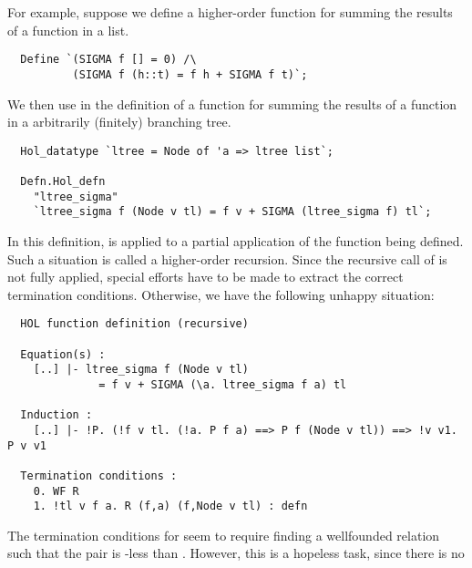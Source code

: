For example, suppose we define a higher-order function  for
summing the results of a function in a list. 
%
\setcounter{sessioncount}{0}
\begin{session}
\begin{hol}
\begin{verbatim}
  Define `(SIGMA f [] = 0) /\
          (SIGMA f (h::t) = f h + SIGMA f t)`;
\end{verbatim}
\end{hol}
\end{session}
% 
We then use  in the definition of a function for 
summing the results of a function in a arbitrarily 
(finitely) branching tree.
%
\begin{session}
\begin{hol}
\begin{verbatim}
  Hol_datatype `ltree = Node of 'a => ltree list`;
 
  Defn.Hol_defn  
    "ltree_sigma"
    `ltree_sigma f (Node v tl) = f v + SIGMA (ltree_sigma f) tl`;
\end{verbatim}
\end{hol}
\end{session}
%
In this definition, \holtxt{SIGMA} is applied to a partial application 
\holtxt{(ltree\_sigma f)} of the function being defined. Such a situation
is called a higher-order recursion. Since the recursive call of 
\holtxt{ltree\_sigma} is not fully applied, special efforts have
to be made to extract the correct termination conditions. Otherwise,
we have the following unhappy situation:
%
\begin{session}
\begin{hol}
\begin{verbatim}
  HOL function definition (recursive)
 
  Equation(s) :
    [..] |- ltree_sigma f (Node v tl)
              = f v + SIGMA (\a. ltree_sigma f a) tl
 
  Induction :
    [..] |- !P. (!f v tl. (!a. P f a) ==> P f (Node v tl)) ==> !v v1. P v v1

  Termination conditions :
    0. WF R
    1. !tl v f a. R (f,a) (f,Node v tl) : defn
\end{verbatim}
\end{hol}
\end{session}
%
The termination conditions for  seem to 
require finding a wellfounded relation  such that the pair 
\holtxt{(f,a)} is \holtxt{R}-less than
. However, this is a hopeless task, since there is no
